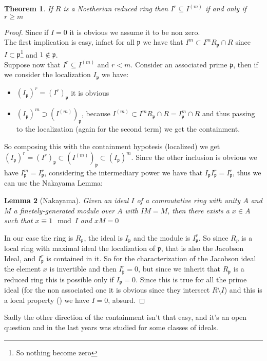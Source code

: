 \documentclass[]{book}
\theoremstyle{plain}
\newtheorem{teo}{Theorem}[section]
\newtheorem{lem}[teo]{Lemma}
\theoremstyle{remark}
\theoremstyle{definition}
\newcommand{\p}{\mathfrak{p}}
\begin{document}
\begin{teo}\label{teo:inv_cont}
	If $ R $ is a Noetherian reduced ring then $ I^r \subseteq I^{(m)}$  if and only if $ r \geq m $
\end{teo}
\begin{proof}
	Since if $ I=0 $ it is obvious we assume it to be non zero.\\
	The first implication is easy, infact for all $ \p $ we have that $ I^m \subset I^mR_\p \cap R $ since $ I \subset \p $\footnote{So nothing become zero} and $ 1 \not \in \p $.\\
	Suppose now that $ I^r \subseteq I^{(m)}$ and $ r < m $. Consider an associated prime $ \p $, then if we consider the localization $ I_\p $ we have:
	\begin{itemize}
	\item $ (I_\p)^r = (I^r)_\p $ it is obvious
	\item $ (I_\p)^m \supset (I^{(m)})_\p $, because $ I^{(m)} \subset I^mR_\p \cap R = I^m_\p \cap R $ and thus passing to the localization (again for the second term) we get the containment.
	\end{itemize}
	So composing this with the containment hypotesis (localized) we get $ (I_\p)^r = (I^r)_\p \subset (I^{(m)})_\p \subset (I_\p)^m $. Since the other inclusion is obvious we have $ I_\p^m= I_\p^r $, considering the intermediary power we have that $ I_\p I_\p^r =I_\p^r $, thus we can use the Nakayama Lemma:
	
	\begin{lem}[Nakayama] \label{lem:naka}
		Given an ideal $ I $ of a commutative ring with unity $ A $ and $ M $ a finetely-generated module over $ A $ with $ IM = M $, then there exists a $ x \in A $ such that $ x \equiv 1 \mod I $ and $ xM = 0 $
	\end{lem}
	In our case the ring is $ R_\p $, the ideal is $ I_\p $ and the module is $ I_\p^{r} $. So since $ R_p $ is a local ring with maximal ideal the localization of $ \p $, that is also the Jacobson Ideal, and $ I_\p ^r $ is contained in it. So for the characterization of the Jacobson ideal the element $ x $ is invertible and then $ I_\p^r = 0 $, but since we inherit that $ R_\p $ is a reduced ring this is possible only if $ I_\p = 0$. Since this is true for all the prime ideal (for the non associated one it is obvious since they intersect $ R \setminus I $) and this is a local property (\cite[Proposition 3.8]{AMCD}) we have $ I = 0 $, absurd.
\end{proof} 
Sadly the other direction of the containment isn't that easy, and it's an open question and in the last years was studied for some classes of ideals.
\end{document}
